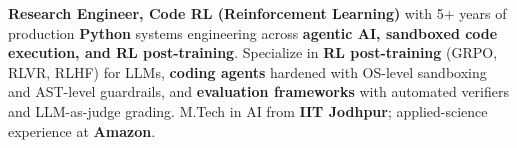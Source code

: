 \documentclass[letter,10pt]{article}
\begin{document}

\textbf{Research Engineer, Code RL (Reinforcement Learning)} with 5+ years of production \textbf{Python} systems engineering across \textbf{agentic AI, sandboxed code execution, and RL post-training}.
Specialize in \textbf{RL post-training} (GRPO, RLVR, RLHF) for LLMs, \textbf{coding agents} hardened with OS-level sandboxing and AST-level guardrails, and \textbf{evaluation frameworks} with automated verifiers and LLM-as-judge grading.
M.Tech in AI from \textbf{IIT Jodhpur}; applied-science experience at \textbf{Amazon}.
\end{document}
